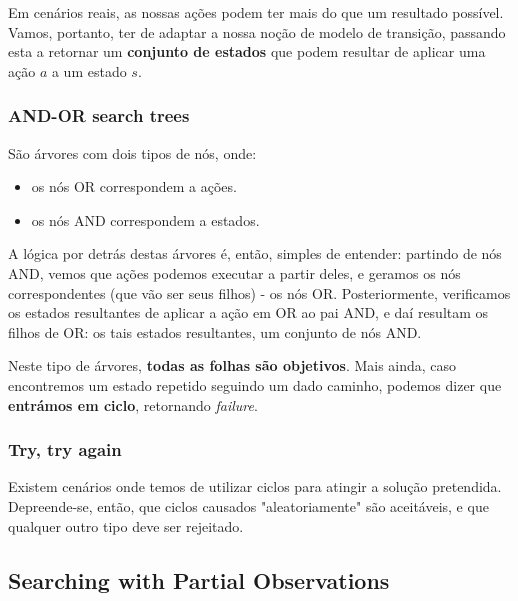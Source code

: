 \documentclass[11pt]{article}
\begin{document}
Em cenários reais, as nossas ações podem ter mais do que um resultado possível. Vamos, portanto, ter de adaptar a nossa noção de modelo de transição, passando esta a retornar um \textbf{conjunto de estados} que podem resultar de aplicar uma ação $a$ a um estado $s$.

\subsubsection{AND-OR search trees}

São árvores com dois tipos de nós, onde:
\begin{itemize}[topsep=2pt,itemsep=0pt]
    \item os nós OR correspondem a ações.
    \item os nós AND correspondem a estados.
\end{itemize}\vspace{4pt}

A lógica por detrás destas árvores é, então, simples de entender: partindo de nós AND, vemos que ações podemos executar a partir deles, e geramos os nós correspondentes (que vão ser seus filhos) - os nós OR. Posteriormente, verificamos os estados resultantes de aplicar a ação em OR ao pai AND, e daí resultam os filhos de OR: os tais estados resultantes, um conjunto de nós AND.\vspace{10pt}

Neste tipo de árvores, \textbf{todas as folhas são objetivos}. Mais ainda, caso encontremos um estado repetido seguindo um dado caminho, podemos dizer que \textbf{entrámos em ciclo}, retornando \textit{failure}.

\subsubsection{Try, try again}

Existem cenários onde temos de utilizar ciclos para atingir a solução pretendida. Depreende-se, então, que ciclos causados "aleatoriamente" são aceitáveis, e que qualquer outro tipo deve ser rejeitado. 

\subsection{Searching with Partial Observations}
\end{document}
